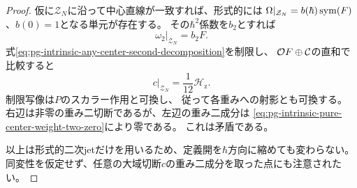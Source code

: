 \begin{proof}
仮に$\mathcal Z_N$に沿って中心直線が一致すれば、形式的には
$\Omega|_{\mathcal Z_N}=b(\hbar)\operatorname{sym}(F)$、$b(0)=1$となる単元が存在する。
その$\hbar^2$係数を$b_2$とすれば
\begin{equation}
 \omega_2|_{\mathcal Z_N}=b_2F.
 \label{eq:pg-intrinsic-line-matching-second-coefficient}
\end{equation}
式\eqref{eq:pg-intrinsic-any-center-second-decomposition}を制限し、
$\mathcal O F\oplus\mathcal C$の直和で比較すると
\begin{equation}
 c|_{\mathcal Z_N}=\frac1{12}\mathscr H_{\mathrm z}.
 \label{eq:pg-intrinsic-zero-impossible-extension}
\end{equation}
制限写像は$P$のスカラー作用と可換し、
従って各重みへの射影とも可換する。
右辺は非零の重み二切断であるが、左辺の重み二成分は
\eqref{eq:pg-intrinsic-pure-center-weight-two-zero}により零である。
これは矛盾である。

以上は形式的二次jetだけを用いるため、定義開を$\hbar$方向に縮めても変わらない。
同変性を仮定せず、任意の大域切断$c$の重み二成分を取った点にも注意されたい。
\end{proof}

